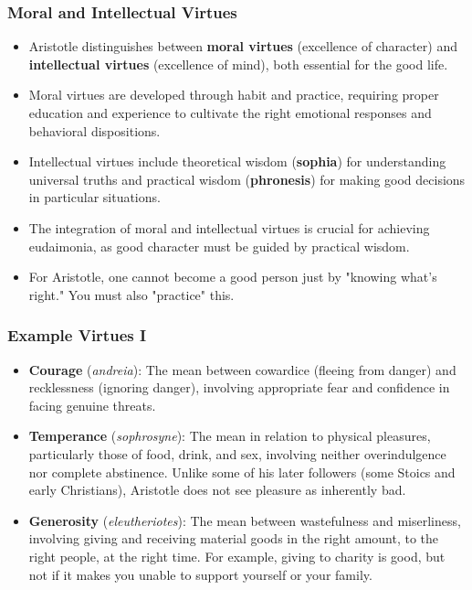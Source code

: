 \documentclass{beamer}
\begin{document}
\begin{frame}
    \frametitle{Moral and Intellectual Virtues}
    \begin{itemize}
        \item Aristotle distinguishes between \textbf{moral virtues} (excellence of character) and \textbf{intellectual virtues} (excellence of mind), both essential for the good life.
        
        \item Moral virtues are developed through habit and practice, requiring proper education and experience to cultivate the right emotional responses and behavioral dispositions.
        
        \item Intellectual virtues include theoretical wisdom (\textbf{sophia}) for understanding universal truths and practical wisdom (\textbf{phronesis}) for making good decisions in particular situations.
        
        \item The integration of moral and intellectual virtues is crucial for achieving eudaimonia, as good character must be guided by practical wisdom.
        
        \item For Aristotle, one cannot become a good person just by "knowing what's right." You must also "practice" this.
    \end{itemize}
\end{frame}

\begin{frame}
    \frametitle{Example Virtues I}
    \begin{itemize}
        \item \textbf{Courage} (\textit{andreia}): The mean between cowardice (fleeing from danger) and recklessness (ignoring danger), involving appropriate fear and confidence in facing genuine threats.
        
        \item \textbf{Temperance} (\textit{sophrosyne}): The mean in relation to physical pleasures, particularly those of food, drink, and sex, involving neither overindulgence nor complete abstinence. Unlike some of his later followers (some Stoics and early Christians), Aristotle does not see pleasure as inherently bad.
        
        \item \textbf{Generosity} (\textit{eleutheriotes}): The mean between wastefulness and miserliness, involving giving and receiving material goods in the right amount, to the right people, at the right time. For example, giving to charity is good, but not if it makes you unable to support yourself or your family.
    \end{itemize}
\end{frame}
\end{document}
